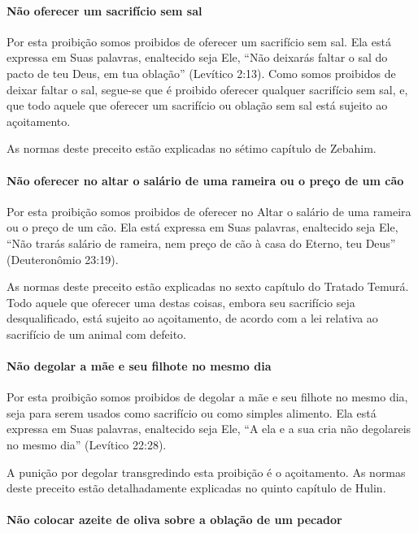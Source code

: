 \paragraph{Não oferecer um sacrifício sem sal}

Por esta proibição somos proibidos de oferecer um sacrifício sem sal.
Ela está expressa em Suas palavras, enaltecido seja Ele, ``Não deixarás
faltar o sal do pacto de teu Deus, em tua oblação'' (Levítico 2:13).
Como somos proibidos de deixar faltar o sal, segue-se que é proibido
oferecer qualquer sacrifício sem sal, e, que todo aquele que oferecer um
sacrifício ou oblação sem sal está sujeito ao açoitamento.

As normas deste preceito estão explicadas no sétimo capítulo de Zebahim.

\paragraph{Não oferecer no altar o salário de uma rameira ou o preço de um cão}

Por esta proibição somos proibidos de oferecer no Altar o salário de uma
rameira ou o preço de um cão. Ela está expressa em Suas palavras,
enaltecido seja Ele, ``Não trarás salário de rameira, nem preço de cão
à casa do Eterno, teu Deus'' (Deuteronômio 23:19).

As normas deste preceito estão explicadas no sexto capítulo do Tratado
Temurá. Todo aquele que oferecer uma destas coisas, embora seu
sacrifício seja desqualificado, está sujeito ao açoitamento, de acordo
com a lei relativa ao sacrifício de um animal com defeito.

\paragraph{Não degolar a mãe e seu filhote no mesmo dia}

Por esta proibição somos proibidos de degolar a mãe e seu filhote no
mesmo dia, seja para serem usados como sacrifício ou como simples
alimento. Ela está expressa em Suas palavras, enaltecido seja Ele, ``A
ela e a sua cria não degolareis no mesmo dia'' (Levítico 22:28).

A punição por degolar transgredindo esta proibição é o açoitamento. As
normas deste preceito estão detalhadamente explicadas no quinto
capítulo de Hulin.

\paragraph{Não colocar azeite de oliva sobre a oblação de um pecador}

